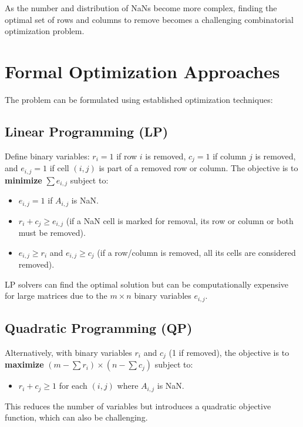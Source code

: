\documentclass[a0,landscape]{a0poster}
\begin{document}
\begin{multicols}{4}
	As the number and distribution of NaNs become more complex, finding the optimal set of rows and columns to remove becomes a challenging combinatorial optimization problem.


	\color{DarkSlateGray} %

	\section*{Formal Optimization Approaches}

	The problem can be formulated using established optimization techniques:

	\subsection*{Linear Programming (LP)}
	Define binary variables: $r_i=1$ if row $i$ is removed, $c_j=1$ if column $j$ is removed, and $e_{i,j}=1$ if cell $(i,j)$ is part of a removed row or column.
	The objective is to \textbf{minimize} $\sum e_{i,j}$ subject to:
	\begin{itemize}
		\item $e_{i,j} = 1$ if $A_{i,j}$ is NaN.
		\item $r_i + c_j \ge e_{i,j}$ (if a NaN cell is marked for removal, its row or column or both must be removed).
		\item $e_{i,j} \ge r_i$ and $e_{i,j} \ge c_j$ (if a row/column is removed, all its cells are considered removed).
	\end{itemize}
	LP solvers can find the optimal solution but can be computationally expensive for large matrices due to the $m \times n$ binary variables $e_{i,j}$.

	\subsection*{Quadratic Programming (QP)}
	Alternatively, with binary variables $r_i$ and $c_j$ (1 if removed), the objective is to \textbf{maximize} $(m-\sum r_i) \times (n-\sum c_j)$ subject to:
	\begin{itemize}
		\item $r_i + c_j \ge 1$ for each $(i,j)$ where $A_{i,j}$ is NaN.
	\end{itemize}
	This reduces the number of variables but introduces a quadratic objective function, which can also be challenging.


\end{multicols}
\end{document}
